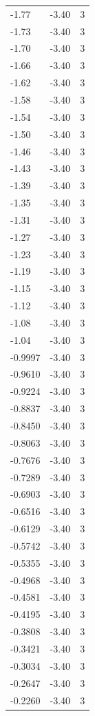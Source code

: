 \begin{longtable}{lrr}
  -1.77 & -3.40 & 3 \\
  -1.73 & -3.40 & 3 \\
  -1.70 & -3.40 & 3 \\
  -1.66 & -3.40 & 3 \\
  -1.62 & -3.40 & 3 \\
  -1.58 & -3.40 & 3 \\
  -1.54 & -3.40 & 3 \\
  -1.50 & -3.40 & 3 \\
  -1.46 & -3.40 & 3 \\
  -1.43 & -3.40 & 3 \\
  -1.39 & -3.40 & 3 \\
  -1.35 & -3.40 & 3 \\
  -1.31 & -3.40 & 3 \\
  -1.27 & -3.40 & 3 \\
  -1.23 & -3.40 & 3 \\
  -1.19 & -3.40 & 3 \\
  -1.15 & -3.40 & 3 \\
  -1.12 & -3.40 & 3 \\
  -1.08 & -3.40 & 3 \\
  -1.04 & -3.40 & 3 \\
  -0.9997 & -3.40 & 3 \\
  -0.9610 & -3.40 & 3 \\
  -0.9224 & -3.40 & 3 \\
  -0.8837 & -3.40 & 3 \\
  -0.8450 & -3.40 & 3 \\
  -0.8063 & -3.40 & 3 \\
  -0.7676 & -3.40 & 3 \\
  -0.7289 & -3.40 & 3 \\
  -0.6903 & -3.40 & 3 \\
  -0.6516 & -3.40 & 3 \\
  -0.6129 & -3.40 & 3 \\
  -0.5742 & -3.40 & 3 \\
  -0.5355 & -3.40 & 3 \\
  -0.4968 & -3.40 & 3 \\
  -0.4581 & -3.40 & 3 \\
  -0.4195 & -3.40 & 3 \\
  -0.3808 & -3.40 & 3 \\
  -0.3421 & -3.40 & 3 \\
  -0.3034 & -3.40 & 3 \\
  -0.2647 & -3.40 & 3 \\
  -0.2260 & -3.40 & 3 \\

\end{longtable}
